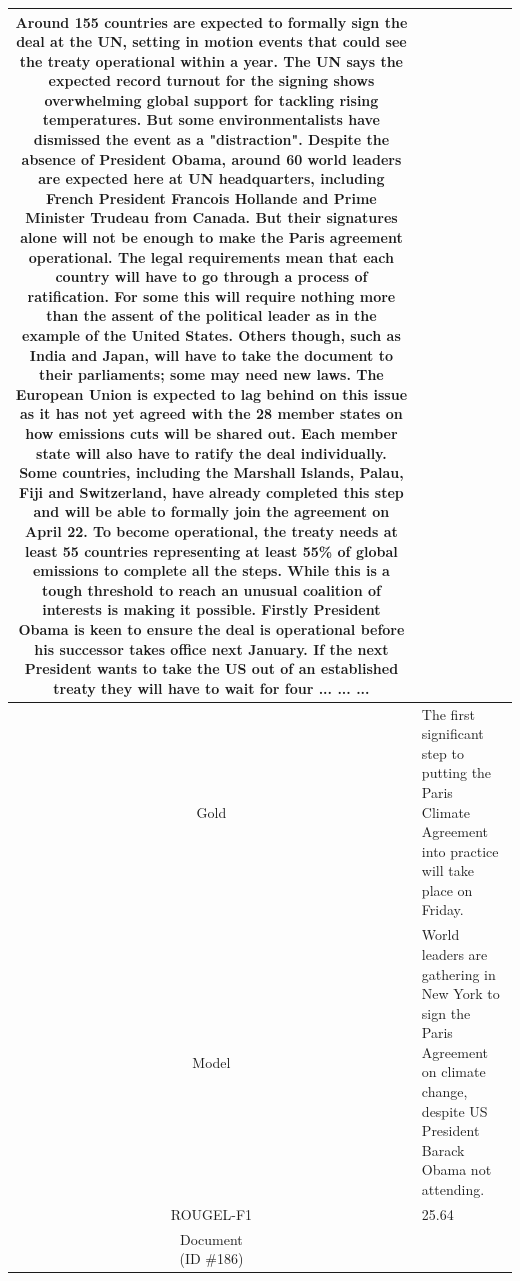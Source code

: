 \begin{table}[bth!]
\begin{tabular}{c|p{}}
Around 155 countries are expected to formally sign the deal at the UN, setting in motion events that could see the treaty operational within a year. The UN says the expected record turnout for the signing shows overwhelming global support for tackling rising temperatures. But some environmentalists have dismissed the event as a "distraction". Despite the absence of President Obama, around 60 world leaders are expected here at UN headquarters, including French President Francois Hollande and Prime Minister Trudeau from Canada. But their signatures alone will not be enough to make the Paris agreement operational. The legal requirements mean that each country will have to go through a process of ratification. For some this will require nothing more than the assent of the political leader as in the example of the United States. Others though, such as India and Japan, will have to take the document to their parliaments; some may need new laws. The European Union is expected to lag behind on this issue as it has not yet agreed with the 28 member states on how emissions cuts will be shared out. Each member state will also have to ratify the deal individually. Some countries, including the Marshall Islands, Palau, Fiji and Switzerland, have already completed this step and will be able to formally join the agreement on April 22. To become operational, the treaty needs at least 55 countries representing at least 55\% of global emissions to complete all the steps. While this is a tough threshold to reach an unusual coalition of interests is making it possible. Firstly President Obama is keen to ensure the deal is operational before his successor takes office next January. If the next President wants to take the US out of an established treaty they will have to wait for four ... ... ... 
\\ \hline
Gold & 
The first significant step to putting the Paris Climate Agreement into practice will take place on Friday.
\\ \hline
Model & 
World leaders are gathering in New York to sign the Paris Agreement on climate change, despite US President Barack Obama not attending.
\\ \hline
ROUGEL-F1 & 
25.64
\\ \hline
\makecell{Document\\(ID \#186)} & 

\end{tabular}
\end{table}
